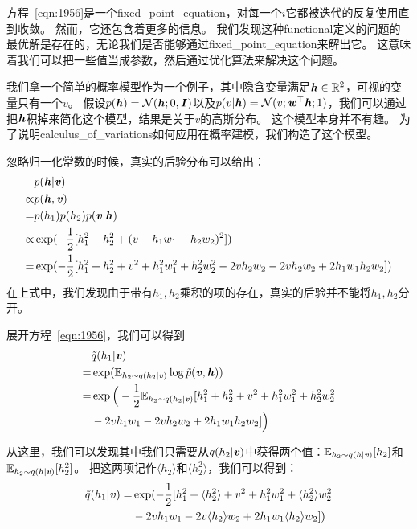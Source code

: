 方程~\eqref{eqn:1956}是一个\gls{fixed_point_equation}，对每一个$i$它都被迭代的反复使用直到收敛。
然而，它还包含着更多的信息。
我们发现这种\gls{functional}定义的问题的最优解是存在的，无论我们是否能够通过\gls{fixed_point_equation}来解出它。
这意味着我们可以把一些值当成参数，然后通过优化算法来解决这个问题。


我们拿一个简单的概率模型作为一个例子，其中隐含变量满足$\boldsymbol{\mathit{h}}\in\mathbb{R}^2$，可视的变量只有一个$v$。
假设$p(\boldsymbol{\mathit{h}}) = \mathcal{N}(\boldsymbol{\mathit{h}};0,\boldsymbol{\mathit{I}})$以及$p(v\vert\boldsymbol{\mathit{h}}) = \mathcal{N}(v;\boldsymbol{\mathit{w}}^{\top}\boldsymbol{\mathit{h}};1)$，我们可以通过把$\boldsymbol{\mathit{h}}$积掉来简化这个模型，结果是关于$v$的高斯分布。
这个模型本身并不有趣。
为了说明\gls{calculus_of_variations}如何应用在概率建模，我们构造了这个模型。



忽略归一化常数的时候，真实的后验分布可以给出：
\begin{align}
	\label{eqn:1957}
   & p(\boldsymbol{\mathit{h}}\vert\boldsymbol{\mathit{v}})\\
 \propto & p(\boldsymbol{\mathit{h}}, \boldsymbol{\mathit{v}})\\
 = & p(h_1) p(h_2) p(\boldsymbol{\mathit{v}}\vert\boldsymbol{\mathit{h}})\\
 \propto & \exp(-\frac{1}{2} [h_1^2 + h_2^2 + (v-h_1w_1 - h_2w_2)^2])\\
 = & \exp(-\frac{1}{2}[h_1^2 + h_2^2 + v^2 + h_1^2w_1^2 + h_2^2w_2^2 - 2vh_2w_2 - 2vh_2w_2 + 2h_1w_1h_2w_2])
\end{align}
在上式中，我们发现由于带有$h_1,h_2$乘积的项的存在，真实的后验并不能将$h_1,h_2$分开。



展开方程~\eqref{eqn:1956}，我们可以得到
\begin{align}
\label{eqn:1962}
& \tilde{q}(h_1\vert\boldsymbol{\mathit{v}})\\ = & \exp(\mathbb{E}_{h_2\sim q(h_2\vert\boldsymbol{\mathit{v}})} \log \tilde{p}(\boldsymbol{\mathit{v}},\boldsymbol{\mathit{h}}))\\
= & \exp\Big( -\frac{1}{2} \mathbb{E}_{h_2\sim q(h_2\vert\boldsymbol{\mathit{v}})} [h_1^2 + h_2^2 + v^2 + h_1^2w_1^2 + h_2^2w_2^2 \\
& -2vh_1w_1 - 2vh_2w_2 + 2h_1w_1h_2w_2]\Big)	
\end{align}


从这里，我们可以发现其中我们只需要从$q(h_2\vert \boldsymbol{\mathit{v}})$中获得两个值：$\mathbb{E}_{h_2\sim q(h\vert\boldsymbol{\mathit{v}})}[h_2]$和$\mathbb{E}_{h_2\sim q(h\vert\boldsymbol{\mathit{v}})}[h_2^2]$。
把这两项记作$\langle h_2 \rangle$和$\langle h_2^2 \rangle$，我们可以得到：
\begin{align}
\label{eqn:1966}
\tilde{q}(h_1\vert\boldsymbol{\mathit{v}}) = & \exp(-\frac{1}{2} [h_1^2 + \langle h_2^2 \rangle  + v^2 + h_1^2w_1^2 + \langle h_2^2 \rangle w_2^2 
\\ &	-2vh_1w_1 - 2v\langle h_2 \rangle w_2 + 2h_1w_1\langle h_2 \rangle w_2])	
\end{align}


